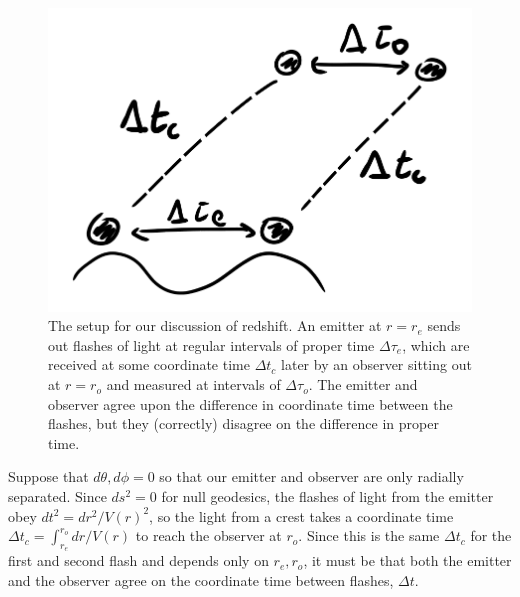 \begin{figure}
    \centering
    \includegraphics{2018/11/20181109_redshift.png}
    \caption{The setup for our discussion of redshift. An emitter at $r=r_e$ sends out flashes of light at regular intervals of proper time $\Delta \tau_e$, which are received at some coordinate time $\Delta t_c$ later by an observer sitting out at $r=r_o$ and measured at intervals of $\Delta \tau_o$. The emitter and observer agree upon the difference in coordinate time between the flashes, but they (correctly) disagree on the difference in proper time.}
    \label{fig:gravitationalredshift}
\end{figure}

Suppose that $d\theta,d\phi=0$ so that our emitter and observer are only radially separated. Since $ds^2=0$ for null geodesics, the flashes of light from the emitter obey $dt^2=dr^2/V(r)^2$, so the light from a crest takes a coordinate time $\Delta t_c=\int_{r_e}^{r_o}dr/V(r)$ to reach the observer at $r_o$. Since this is the same $\Delta t_c$ for the first and second flash and depends only on $r_e,r_o$, it must be that both the emitter and the observer agree on the coordinate time between flashes, $\Delta t$.

